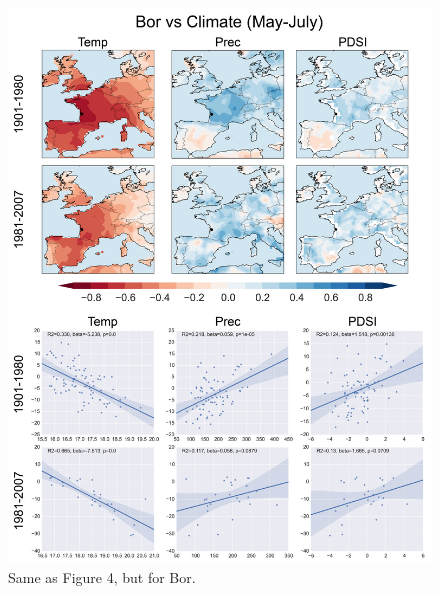\documentclass[12pt]{article}
\begin{document}
\begin{figure}
\center
\includegraphics[width=.9\columnwidth,scale=2]{SUPP_fig_05_Bor_MJJ_climate_onedeg.png}
\caption{Same as Figure 4, but for Bor.}
\end{figure}
\end{document}
